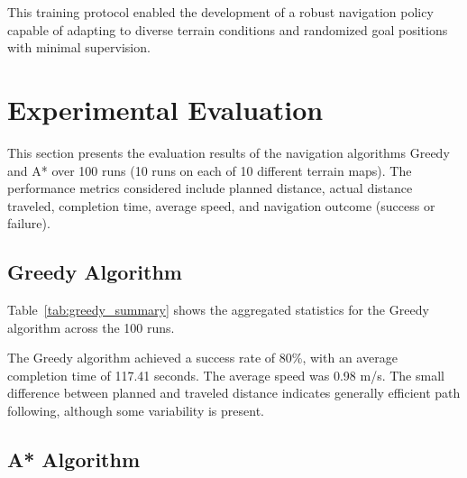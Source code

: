 \documentclass[conference]{IEEEtran}
\begin{document}
This training protocol enabled the development of a robust navigation policy capable of adapting to diverse terrain conditions and randomized goal positions with minimal supervision.

\section{Experimental Evaluation}

This section presents the evaluation results of the navigation algorithms Greedy and A* over 100 runs (10 runs on each of 10 different terrain maps). The performance metrics considered include planned distance, actual distance traveled, completion time, average speed, and navigation outcome (success or failure).

\subsection{Greedy Algorithm}

Table~\ref{tab:greedy_summary} shows the aggregated statistics for the Greedy algorithm across the 100 runs.

\begin{table}[ht]
\centering
\caption{Summary statistics for the Greedy algorithm (100 runs).}
\label{tab:greedy_summary}
\end{table}

The Greedy algorithm achieved a success rate of 80\%, with an average completion time of 117.41 seconds. The average speed was 0.98 m/s. The small difference between planned and traveled distance indicates generally efficient path following, although some variability is present.

\subsection{A* Algorithm}
\end{document}
